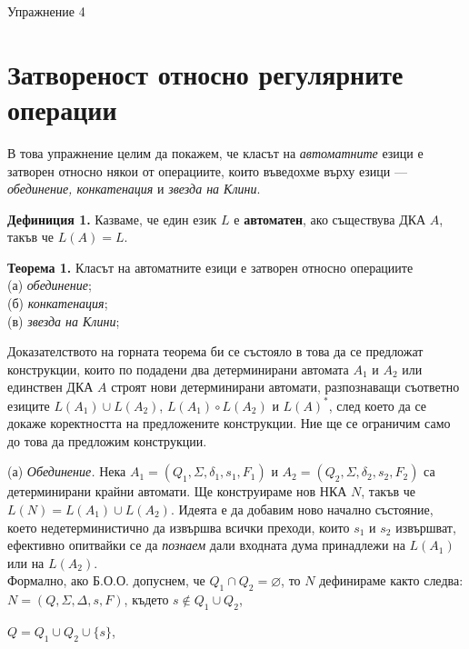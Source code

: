 \documentclass{article}
\begin{document}
\begin{center}
    {\huge Упражнение 4}
\end{center}

\vspace{15pt}

\section{Затвореност относно регулярните операции}
      В това упражнение целим да покажем, че класът на \textit{автоматните} езици е
      затворен относно някои от операциите, които въведохме върху езици — 
      \textit{обединение, конкатенация} и \textit{звезда на Клини}.

      \vspace{15pt}

      \textbf{Дефиниция 1.} Казваме, че един език $L$ е \textbf{автоматен}, ако
      съществува ДКА $A$, такъв че $L(A) = L$.

      \vspace{15pt}

      \textbf{Теорема 1.} Класът на автоматните езици е затворен относно операциите \\
      (а) \textit{обединение}; \\
      (б) \textit{конкатенация}; \\
      (в) \textit{звезда на Клини}; \\

     \vspace{15pt}

     Доказателството на горната теорема би се състояло в това да се предложат конструкции,
     които по подадени два детерминирани автомата $A_1$ и $A_2$ или единствен ДКА
     $A$ строят нови детерминирани автомати, разпознаващи съответно езиците 
     $L(A_1) \cup L(A_2)$, $L(A_1) \circ L(A_2)$ и $L(A)^*$, след което да се докаже 
     коректността на предложените конструкции. Ние ще се ограничим само до това да 
     предложим конструкции.

     \vspace{15pt}
     
     (а) \textit{Обединение.} Нека $A_1 = (Q_1,\Sigma,\delta_1,s_1,F_1)$ и 
     $A_2 = (Q_2,\Sigma,\delta_2,s_2,F_2)$ са детерминирани крайни автомати. Ще
     конструираме нов НКА $N$, такъв че $L(N) = L(A_1) \cup L(A_2)$. Идеята е да
     добавим ново начално състояние, което недетерминистично да извършва всички преходи,
     които $s_1$ и $s_2$ извършват, ефективно опитвайки се да \textit{познаем} 
     дали входната дума принадлежи на $L(A_1)$ или на $L(A_2)$. \\
     \hspace{15pt} Формално, ако Б.О.О.
     допуснем, че $Q_1 \cap Q_2 = \varnothing$, то $N$ дефинираме както следва:
     $N = (Q,\Sigma,\Delta,s,F)$, където $s \notin Q_1 \cup Q_2$,
     \begin{center}
        $Q = Q_1 \cup Q_2 \cup \{s\}$, \\
     \end{center}
\end{document}
